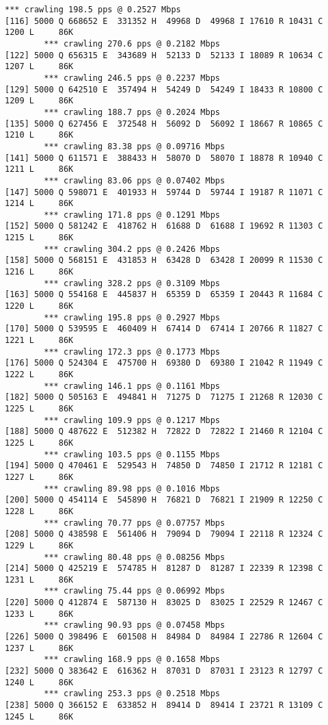 \documentclass[11pt]{article}
\begin{document}
\begin{lstlisting}[label=app-trace,caption=Output of Homework 1]
        *** crawling 198.5 pps @ 0.2527 Mbps
[116] 5000 Q 668652 E  331352 H  49968 D  49968 I 17610 R 10431 C  1200 L     86K
        *** crawling 270.6 pps @ 0.2182 Mbps
[122] 5000 Q 656315 E  343689 H  52133 D  52133 I 18089 R 10634 C  1207 L     86K
        *** crawling 246.5 pps @ 0.2237 Mbps
[129] 5000 Q 642510 E  357494 H  54249 D  54249 I 18433 R 10800 C  1209 L     86K
        *** crawling 188.7 pps @ 0.2024 Mbps
[135] 5000 Q 627456 E  372548 H  56092 D  56092 I 18667 R 10865 C  1210 L     86K
        *** crawling 83.38 pps @ 0.09716 Mbps
[141] 5000 Q 611571 E  388433 H  58070 D  58070 I 18878 R 10940 C  1211 L     86K
        *** crawling 83.06 pps @ 0.07402 Mbps
[147] 5000 Q 598071 E  401933 H  59744 D  59744 I 19187 R 11071 C  1214 L     86K
        *** crawling 171.8 pps @ 0.1291 Mbps
[152] 5000 Q 581242 E  418762 H  61688 D  61688 I 19692 R 11303 C  1215 L     86K
        *** crawling 304.2 pps @ 0.2426 Mbps
[158] 5000 Q 568151 E  431853 H  63428 D  63428 I 20099 R 11530 C  1216 L     86K
        *** crawling 328.2 pps @ 0.3109 Mbps
[163] 5000 Q 554168 E  445837 H  65359 D  65359 I 20443 R 11684 C  1220 L     86K
        *** crawling 195.8 pps @ 0.2927 Mbps
[170] 5000 Q 539595 E  460409 H  67414 D  67414 I 20766 R 11827 C  1221 L     86K
        *** crawling 172.3 pps @ 0.1773 Mbps
[176] 5000 Q 524304 E  475700 H  69380 D  69380 I 21042 R 11949 C  1222 L     86K
        *** crawling 146.1 pps @ 0.1161 Mbps
[182] 5000 Q 505163 E  494841 H  71275 D  71275 I 21268 R 12030 C  1225 L     86K
        *** crawling 109.9 pps @ 0.1217 Mbps
[188] 5000 Q 487622 E  512382 H  72822 D  72822 I 21460 R 12104 C  1225 L     86K
        *** crawling 103.5 pps @ 0.1155 Mbps
[194] 5000 Q 470461 E  529543 H  74850 D  74850 I 21712 R 12181 C  1227 L     86K
        *** crawling 89.98 pps @ 0.1016 Mbps
[200] 5000 Q 454114 E  545890 H  76821 D  76821 I 21909 R 12250 C  1228 L     86K
        *** crawling 70.77 pps @ 0.07757 Mbps
[208] 5000 Q 438598 E  561406 H  79094 D  79094 I 22118 R 12324 C  1229 L     86K
        *** crawling 80.48 pps @ 0.08256 Mbps
[214] 5000 Q 425219 E  574785 H  81287 D  81287 I 22339 R 12398 C  1231 L     86K
        *** crawling 75.44 pps @ 0.06992 Mbps
[220] 5000 Q 412874 E  587130 H  83025 D  83025 I 22529 R 12467 C  1233 L     86K
        *** crawling 90.93 pps @ 0.07458 Mbps
[226] 5000 Q 398496 E  601508 H  84984 D  84984 I 22786 R 12604 C  1237 L     86K
        *** crawling 168.9 pps @ 0.1658 Mbps
[232] 5000 Q 383642 E  616362 H  87031 D  87031 I 23123 R 12797 C  1240 L     86K
        *** crawling 253.3 pps @ 0.2518 Mbps
[238] 5000 Q 366152 E  633852 H  89414 D  89414 I 23721 R 13109 C  1245 L     86K

\end{lstlisting}
\end{document}
